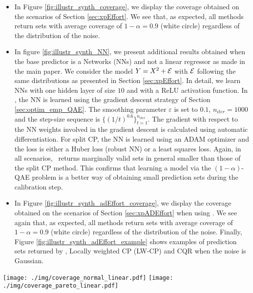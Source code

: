 \begin{itemize}
	
	\item In Figure \ref{fig:illustr_synth_coverage}, we display the coverage obtained on the scenarios of Section \ref{sec:xpEffort}. We see that, as expected, all methods return sets with average coverage of $1-\alpha=0.9$ (white circle) regardless of the distribution of the noise.
	\item In figure \ref{fig:illustr_synth_NN}, we present additional results obtained when the base predictor is a Networks (NNs) and not a linear regressor as made in the main paper. We consider the model $Y = X^2 + {\cal E}$ with ${\cal E}$ following the same distributions as presented in Section \ref{sec:xpEffort}. In detail, we learn NNs with one hidden layer of size $10$ and with a ReLU activation function. In \method, the NN is learned using the gradient descent strategy of Section \ref{sec:optim_emp_QAE}. The smoothing parameter $\varepsilon$ is set to $0.1$, $n_{iter}=1000$ and the step-size sequence is $\{(1/t)^{0.6}\}^{n_{iter}}_{t=1}$. The gradient with respect to the NN weights involved in the gradient descent is calculated using automatic differentiation. For split CP, the NN is learned using an ADAM optimizer and the loss is either a Huber loss (robust NN) or a least squares loss. Again, in all scenarios, \method~returns marginally valid sets in general smaller than those of the split CP method. This confirms that learning a model via the $(1-\alpha)$-QAE problem is a better way of obtaining small prediction sets during the calibration step.
	
	\item In Figure \ref{fig:illustr_synth_adEffort_coverage}, we display the coverage obtained on the scenarios of Section \ref{sec:xpADEffort} when using \methodAD. We see again that, as expected, all methods return sets with average coverage of $1-\alpha=0.9$ (white circle) regardless of the distribution of the noise. Finally, Figure \ref{fig:illustr_synth_adEffort_example} shows examples of prediction sets returned by \methodAD, Locally weighted CP (LW-CP) and CQR when the noise is Gaussian.
\end{itemize}




\begin{figure*}[h!]
	\centering
	\texttt{[image: ./img/coverage\_normal\_linear.pdf]}
	\texttt{[image: ./img/coverage\_pareto\_linear.pdf]}
	\caption{Synthetic data: Boxplots of the $50$ empirical coverages obtained by evaluating \method~(see Section \ref{sec:xpEffort}). The white circle corresponds to the mean.} 
	\label{fig:illustr_synth_coverage}
\end{figure*}

